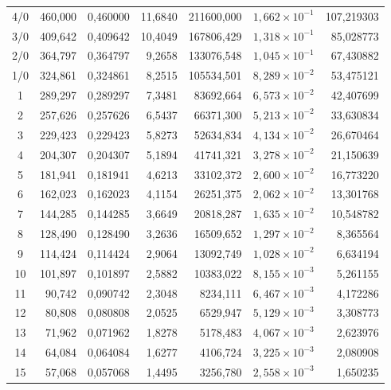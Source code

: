 \begin{longtable}{crrrrrr}
 4/0  & 460,000 &   0,460000 &    11,6840 & 211600,000 &  $1{,}662\times 10^{-1}$ & 107,219303 \\
 3/0  & 409,642 &   0,409642 &    10,4049 & 167806,429 &  $1{,}318\times 10^{-1}$ &  85,028773 \\
 2/0  & 364,797 &   0,364797 &     9,2658 & 133076,548 &  $1{,}045\times 10^{-1}$ &  67,430882 \\
 1/0  & 324,861 &   0,324861 &     8,2515 & 105534,501 &  $8{,}289\times 10^{-2}$ &  53,475121 \\
 1 &    289,297 &   0,289297 &     7,3481 &  83692,664 &  $6{,}573\times 10^{-2}$ &  42,407699 \\
 2 &    257,626 &   0,257626 &     6,5437 &  66371,300 &  $5{,}213\times 10^{-2}$ &  33,630834 \\
 3 &    229,423 &   0,229423 &     5,8273 &  52634,834 &  $4{,}134\times 10^{-2}$ &  26,670464 \\
 4 &    204,307 &   0,204307 &     5,1894 &  41741,321 &  $3{,}278\times 10^{-2}$ &  21,150639 \\
 5 &    181,941 &   0,181941 &     4,6213 &  33102,372 &  $2{,}600\times 10^{-2}$ &  16,773220 \\
 6 &    162,023 &   0,162023 &     4,1154 &  26251,375 &  $2{,}062\times 10^{-2}$ &  13,301768 \\
 7 &    144,285 &   0,144285 &     3,6649 &  20818,287 &  $1{,}635\times 10^{-2}$ &  10,548782 \\
 8 &    128,490 &   0,128490 &     3,2636 &  16509,652 &  $1{,}297\times 10^{-2}$ &   8,365564 \\
 9 &    114,424 &   0,114424 &     2,9064 &  13092,749 &  $1{,}028\times 10^{-2}$ &   6,634194 \\
10 &    101,897 &   0,101897 &     2,5882 &  10383,022 &  $8{,}155\times 10^{-3}$ &   5,261155 \\
11 &     90,742 &   0,090742 &     2,3048 &   8234,111 &  $6{,}467\times 10^{-3}$ &   4,172286 \\
12 &     80,808 &   0,080808 &     2,0525 &   6529,947 &  $5{,}129\times 10^{-3}$ &   3,308773 \\
13 &     71,962 &   0,071962 &     1,8278 &   5178,483 &  $4{,}067\times 10^{-3}$ &   2,623976 \\
14 &     64,084 &   0,064084 &     1,6277 &   4106,724 &  $3{,}225\times 10^{-3}$ &   2,080908 \\
15 &     57,068 &   0,057068 &     1,4495 &   3256,780 &  $2{,}558\times 10^{-3}$ &   1,650235 \\

\end{longtable}
